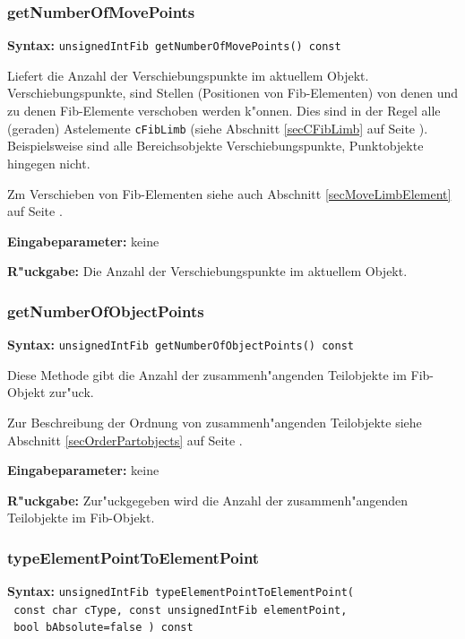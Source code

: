 \subsubsection{getNumberOfMovePoints}
\textbf{Syntax:} \verb|unsignedIntFib getNumberOfMovePoints() const|

\bigskip\noindent
Liefert die Anzahl der Verschiebungspunkte im aktuellem Objekt.
Verschiebungspunkte, sind Stellen (Positionen von Fib-Elementen) von denen und zu denen Fib-Elemente verschoben werden k"onnen. Dies sind in der Regel alle (geraden) Astelemente \verb|cFibLimb| (siehe Abschnitt \ref{secCFibLimb} auf Seite \pageref{secCFibLimb} ). Beispielsweise sind alle Bereichsobjekte Verschiebungspunkte, Punktobjekte hingegen nicht.

Zm Verschieben von Fib-Elementen siehe auch Abschnitt \ref{secMoveLimbElement} auf Seite \pageref{secMoveLimbElement} .

\bigskip\noindent
\textbf{Eingabeparameter:} keine


\bigskip\noindent
\textbf{R"uckgabe:} Die Anzahl der Verschiebungspunkte im aktuellem Objekt.


\subsubsection{getNumberOfObjectPoints}

\textbf{Syntax:} \verb|unsignedIntFib getNumberOfObjectPoints() const|

\bigskip\noindent
Diese Methode gibt die Anzahl der zusammenh"angenden Teilobjekte im Fib-Objekt zur"uck.

Zur Beschreibung der Ordnung von zusammenh"angenden Teilobjekte siehe Abschnitt \ref{secOrderPartobjects} auf Seite \pageref{secOrderPartobjects} .

\bigskip\noindent
\textbf{Eingabeparameter:} keine

\bigskip\noindent
\textbf{R"uckgabe:} Zur"uckgegeben wird die Anzahl der zusammenh"angenden Teilobjekte im Fib-Objekt.


\subsubsection{typeElementPointToElementPoint}
\textbf{Syntax:} \verb|unsignedIntFib typeElementPointToElementPoint( | \\\verb| const char cType, const unsignedIntFib elementPoint, | \\\verb| bool bAbsolute=false ) const|

